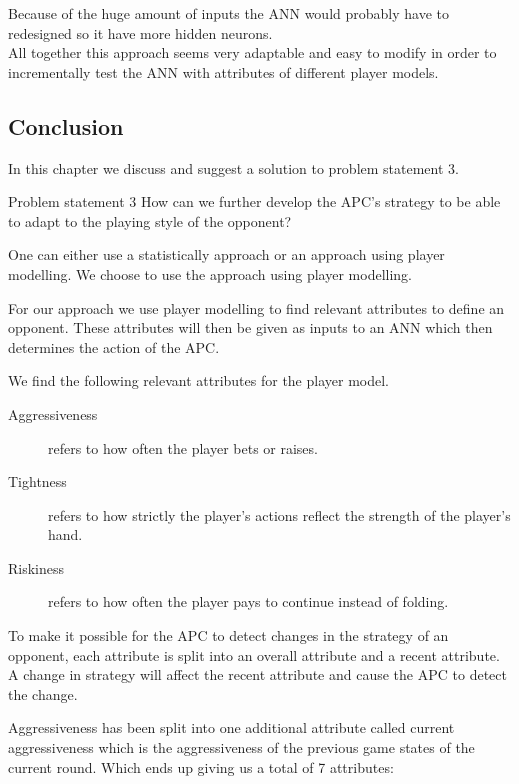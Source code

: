 Because of the huge amount of inputs the ANN would probably have to redesigned so it have more hidden neurons.\\

All together this approach seems very adaptable and easy to modify in order to incrementally test the ANN with attributes of different player models.


\subsection{Conclusion}
In this chapter we discuss and suggest a solution to problem statement 3.

\vspace{4mm}
\begin{statementBox2}{Problem statement 3}
How can we further develop the APC's strategy to be able to adapt to the playing style of the opponent?
\end{statementBox2}
\vspace{4mm} 

One can either use a statistically approach or an approach using player modelling. We choose to use the approach using player modelling. 

For our approach we use player modelling to find relevant attributes to define an opponent. These attributes will then be given as inputs to an ANN which then determines the action of the APC. 

We find the following relevant attributes for the player model.

\begin{description}
\item[Aggressiveness] refers to how often the player bets or raises.
\item[Tightness] refers to how strictly the player's actions reflect the strength of the player's hand.
\item[Riskiness] refers to how often the player pays to continue instead of folding.
\end{description}

To make it possible for the APC to detect changes in the strategy of an opponent, each attribute is split into an overall attribute and a recent attribute. A change in strategy will affect the recent attribute and cause the APC to detect the change.

Aggressiveness has been split into one additional attribute called current aggressiveness which is the aggressiveness of the previous game states of the current round. Which ends up giving us a total of 7 attributes:

